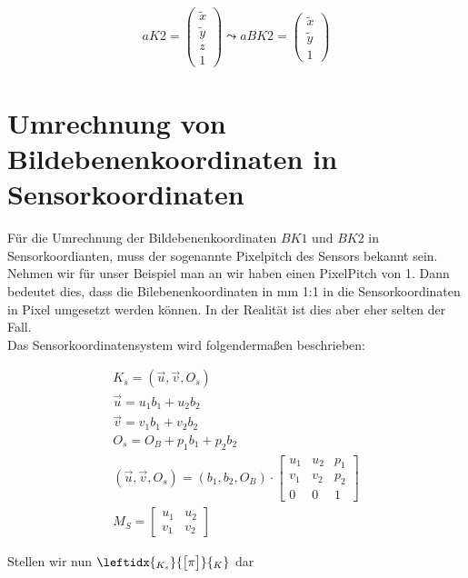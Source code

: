 \begin{gather}
aK2 =
\begin{pmatrix}
\tilde{x}\\
\tilde{y}\\
z\\
1
\end{pmatrix} 
\leadsto aBK2 = 		
\begin{pmatrix}
\tilde{x}\\
\tilde{y}\\
1
\end{pmatrix}
\end{gather}

\section{Umrechnung von Bildebenenkoordinaten in Sensorkoordinaten}
	Für die Umrechnung der Bildebenenkoordinaten \ensuremath{BK1} und \ensuremath{BK2} in Sensorkoordianten, muss der sogenannte Pixelpitch des Sensors bekannt sein. Nehmen wir für unser Beispiel man an wir haben einen PixelPitch von 1. Dann bedeutet dies, dass die Bilebenenkoordinaten in mm 1:1 in die Sensorkoordinaten in Pixel umgesetzt werden können. In der Realität ist dies aber eher selten der Fall. \\
Das Sensorkoordinatensystem wird folgendermaßen beschrieben:

\begin{gather}
K_s = (\vec{u},\vec{v},O_s)\\	
\vec{u} = u_1b_1+u_2b_2\\
\vec{v} = v_1b_1+v_2b_2\\
O_s = O_B+p_1b_1+p_2b_2\\
(\vec{u},\vec{v},O_s)=(b_1,b_2,O_B)\cdot
\begin{bmatrix}
u_1&u_2&p_1\\
v_1&v_2&p_2\\
0&0&1
\end{bmatrix}	\\
M_S = 	
\begin{bmatrix}
u_1&u_2\\
v_1&v_2
\end{bmatrix}
\end{gather}

Stellen wir nun \ensuremath{	\leftidx{_{K_{s}}}{\begin{bmatrix}
			\pi
	\end{bmatrix}}{_{K_{}}}} dar\\

